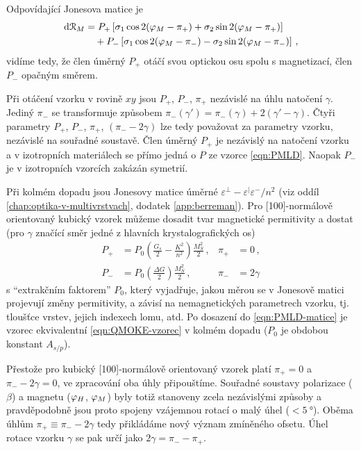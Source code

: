 Odpovídající Jonesova matice je 
\begin{equation}
    \label{eqn:dR-kubicky}
    \begin{split}
        \textrm{d}\mathcal{R}_M &= P_+ \left[\sigma_1\cos2(\varphi_M-\pi_+) + \sigma_2 \sin2(\varphi_M-\pi_+)\right] \\ 
                              & \quad+ P_- \left[\sigma_1\cos2(\varphi_M-\pi_-) - \sigma_2 \sin2(\varphi_M-\pi_-) \right] \,,
\end{split}
\end{equation}
vidíme tedy, že člen úměrný $P_+$ otáčí svou optickou osu spolu s magnetizací, člen $P_-$ opačným směrem.

Při otáčení vzorku v rovině $xy$ jsou $P_+$, $P_-$, $\pi_+$ nezávislé na úhlu natočení $\gamma$.
Jediný $\pi_-$ se transformuje způsobem $\pi_-(\gamma')=\pi_-(\gamma)+2(\gamma'-\gamma)$.
Čtyři parametry $P_+$, $P_-$, $\pi_+$, $(\pi_--2\gamma)$ lze tedy považovat za parametry vzorku, nezávislé na souřadné soustavě.
Člen úměrný $P_+$ je nezávislý na natočení vzorku a v izotropních materiálech se přímo jedná o $P$ ze vzorce \ref{eqn:PMLD}.
Naopak $P_-$ je v izotropních vzorcích zakázán symetrií.

Při kolmém dopadu jsou Jonesovy matice úměrné $\varepsilon^\perp-\varepsilon^\vert\varepsilon^-/n^2$ (viz oddíl \ref{chap:optika-v-multivrstvach}, dodatek \ref{app:berreman}).
Pro [100]-normálově orientovaný kubický vzorek můžeme dosadit tvar magnetické permitivity a dostat (pro $\gamma$ značící směr jedné z hlavních krystalografických os)
\begin{subequations}
    \label{eqn:PMLD-kubicke}
\begin{align}
    P_+ &= P_0 \left(\frac{G_s}{2} - \frac{K^2}{n^2}\right) \frac{M_S^2}{2} \,, & \pi_+ &=0 \,,\\
    P_- &= P_0 \left(\frac{\Delta G}{2}\right) \frac{M_S^2}{2} \,, & \pi_- &=2\gamma \label{eqn:PminusG}
\end{align}
\end{subequations}
s ``extrakčním faktorem'' $P_0$, který vyjadřuje, jakou měrou se v Jonesově matici projevují změny permitivity, a závisí na nemagnetických parametrech vzorku, tj. tloušťce vrstev, jejich indexech lomu, atd.
Po dosazení do \eqref{eqn:PMLD-matice} je vzorec ekvivalentní \eqref{eqn:QMOKE-vzorec} v kolmém dopadu ($P_0$ je obdobou konstant $A_{s/p}$).

Přestože pro kubický [100]-normálově orientovaný vzorek platí $\pi_+=0$ a $\pi_--2\gamma=0$, ve zpracování oba úhly připouštíme.
Souřadné soustavy polarizace ($\beta$) a magnetu ($\varphi_H$, $\varphi_M$) byly totiž stanoveny zcela nezávislými způsoby a pravděpodobně jsou proto spojeny vzájemnou rotací o malý úhel ($<\SI{5}{\degree}$).
Oběma úhlům $\pi_+ \equiv \pi_--2\gamma$ tedy přikládáme nový význam zmíněného ofsetu.
Úhel rotace vzorku $\gamma$ se pak určí jako $2\gamma = \pi_- - \pi_+$.


